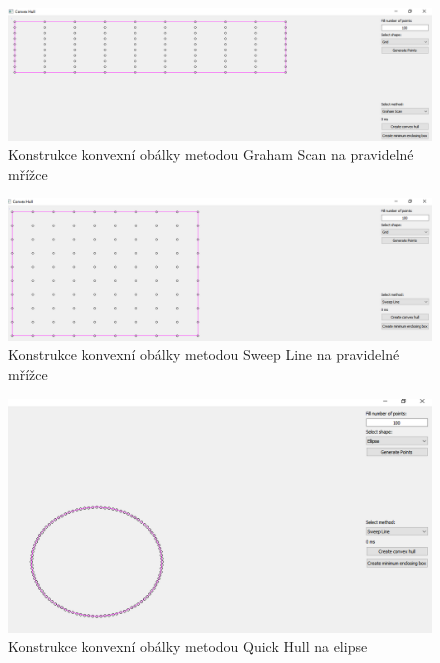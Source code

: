 \documentclass[a4paper,11pt,twoside]{article}
\begin{document}
\vspace{0.2cm}
\begin{figure}[hbt!] 
\begin{center}
\includegraphics[width=14cm]{pictures/graham_grid.png} 
\caption[Konstrukce konvexní obálky metodou Graham Scan na pravidelné mřížce]{Konstrukce konvexní obálky metodou Graham Scan na pravidelné mřížce}
\label{fig:gr}
\end{center}
\end{figure}
\vspace{-0.4cm}

\begin{figure}[hbt!] 
\begin{center}
\includegraphics[width=14cm]{pictures/sweep_grid.png} 
\caption[Konstrukce konvexní obálky metodou Sweep Line na pravidelné mřížce]{Konstrukce konvexní obálky metodou Sweep Line na pravidelné mřížce}
\label{fig:sw}
\end{center}
\end{figure}
\vspace{-0.4cm}

\begin{figure}[hbt!] 
\begin{center}
\includegraphics[width=14cm]{pictures/sweep_ellipse.png} 
\caption[Konstrukce konvexní obálky metodou Quick Hull na elipse]{Konstrukce konvexní obálky metodou Quick Hull na elipse}
\label{fig:qh}
\end{center}
\end{figure}
\vspace{-0.4cm}
\end{document}
